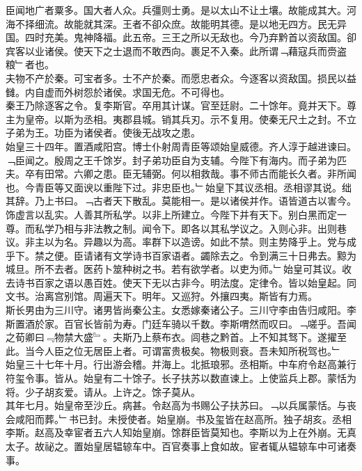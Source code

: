 \documentclass{zhvt-classic}
\begin{document}
\hspace*{2em}臣闻地广者粟多。国大者人众。兵彊则士勇。是以太山不让土壤。故能成其大。河海不择细流。故能就其深。王者不卻众庶。故能明其德。是以地无四方。民无异国。四时充美。鬼神降福。此五帝。三王之所以无敌也。今乃弃黔首以资敌国。卻宾客以业诸侯。使天下之士退而不敢西向。裹足不入秦。此所谓﹁藉寇兵而赍盗粮﹂者也。\\
\hspace*{2em}夫物不产於秦。可宝者多。士不产於秦。而愿忠者众。今逐客以资敌国。损民以益雠。内自虚而外树怨於诸侯。求国无危。不可得也。\\
\hspace*{2em}秦王乃除逐客之令。复李斯官。卒用其计谋。官至廷尉。二十馀年。竟并天下。尊主为皇帝。以斯为丞相。夷郡县城。销其兵刃。示不复用。使秦无尺土之封。不立子弟为王。功臣为诸侯者。使後无战攻之患。\\
\hspace*{2em}始皇三十四年。置酒咸阳宫。博士仆射周青臣等颂始皇威德。齐人淳于越进谏曰。﹁臣闻之。殷周之王千馀岁。封子弟功臣自为支辅。今陛下有海内。而子弟为匹夫。卒有田常。六卿之患。臣无辅弼。何以相救哉。事不师古而能长久者。非所闻也。今青臣等又面谀以重陛下过。非忠臣也。﹂始皇下其议丞相。丞相谬其说。绌其辞。乃上书曰。﹁古者天下散乱。莫能相一。是以诸侯并作。语皆道古以害今。饰虚言以乱实。人善其所私学。以非上所建立。今陛下并有天下。别白黑而定一尊。而私学乃相与非法教之制。闻令下。即各以其私学议之。入则心非。出则巷议。非主以为名。异趣以为高。率群下以造谤。如此不禁。则主势降乎上。党与成乎下。禁之便。臣请诸有文学诗书百家语者。蠲除去之。令到满三十日弗去。黥为城旦。所不去者。医药卜筮种树之书。若有欲学者。以吏为师。﹂始皇可其议。收去诗书百家之语以愚百姓。使天下无以古非今。明法度。定律令。皆以始皇起。同文书。治离宫别馆。周遍天下。明年。又巡狩。外攘四夷。斯皆有力焉。\\
\hspace*{2em}斯长男由为三川守。诸男皆尚秦公主。女悉嫁秦诸公子。三川守李由告归咸阳。李斯置酒於家。百官长皆前为寿。门廷车骑以千数。李斯喟然而叹曰。﹁嗟乎。吾闻之荀卿曰﹃物禁大盛﹄。夫斯乃上蔡布衣。闾巷之黔首。上不知其驽下。遂擢至此。当今人臣之位无居臣上者。可谓富贵极矣。物极则衰。吾未知所税驾也。﹂\\
\hspace*{2em}始皇三十七年十月。行出游会稽。并海上。北抵琅邪。丞相斯。中车府令赵高兼行符玺令事。皆从。始皇有二十馀子。长子扶苏以数直谏上。上使监兵上郡。蒙恬为将。少子胡亥爱。请从。上许之。馀子莫从。\\
\hspace*{2em}其年七月。始皇帝至沙丘。病甚。令赵高为书赐公子扶苏曰。﹁以兵属蒙恬。与丧会咸阳而葬。﹂书已封。未授使者。始皇崩。书及玺皆在赵高所。独子胡亥。丞相李斯。赵高及幸宦者五六人知始皇崩。馀群臣皆莫知也。李斯以为上在外崩。无真太子。故祕之。置始皇居辒辌车中。百官奏事上食如故。宦者辄从辒辌车中可诸奏事。\\
\end{document}
